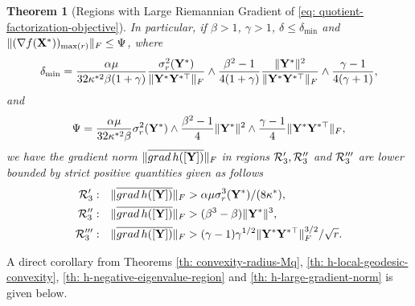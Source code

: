 \documentclass[11pt]{article}
\newtheorem{Theorem}{Theorem}
\newcommand{\0}{{\mathbf{0}}}
\newcommand{\1}{{\mathbf{1}}}
\newcommand{\X}{{\mathbf{X}}}
\newcommand{\Y}{{\mathbf{Y}}}
\newcommand{\cR}{{\cal R}}
\newcommand{\grad}{{\rm grad}}
\newcommand{\F}{{\rm F}}
\newcommand{\nc}{\normalcolor}
\begin{document}
\begin{Theorem}[Regions with Large Riemannian Gradient of \eqref{eq: quotient-factorization-objective}]
In particular, if $\beta > 1$, $\gamma > 1$, $\delta \leq \delta_{\min}$ and $\| ( \nabla f(\X^*) )_{\max(r)} \|_\F \leq \Psi$, where
\begin{equation} \label{def: delta-min}
	\delta_{\min} = \frac{\alpha \mu }{32 \kappa^{*2} \beta (1 + \gamma) } \frac{\sigma_r^2(\Y^*)}{ \| \Y^* \Y^{*\top} \|_\F } \wedge  \frac{  \beta^2 - 1 }{ 4(1 + \gamma) } \frac{ \|\Y^*\|^2 }{ \| \Y^* \Y^{*\top} \|_\F } \wedge  \frac{  \gamma - 1 }{ 4( \gamma + 1 ) },
\end{equation} and
\begin{equation} \label{def: Psi}
	\Psi = \frac{\alpha \mu}{32 \kappa^{*2} \beta } \sigma^2_r(\Y^*) \wedge  \frac{ \beta^2 -1 }{4 } \|\Y^*\|^2 \wedge   \frac{\gamma-1}{4}  \|\Y^* \Y^{*\top} \|_\F, 
\end{equation}
 we have the gradient norm $\|\overline{\grad\, h([\Y])} \|_\F$ in regions $\cR_3', \cR_3''$ and $\cR_3'''$ are lower bounded by strict positive quantities given as follows
\begin{equation} \label{ineq: h-gradient-bound-all}
	\begin{split}
		\cR_3': &  \quad \|\overline{\grad\, h([\Y])} \|_\F > \alpha\mu \sigma^3_r(\Y^*)/ (8 \kappa^* ), \\
		\cR_3'': &  \quad  \|\overline{\grad\, h([\Y])} \|_\F > (\beta^3 - \beta) \|\Y^*\|^3, \\
		\cR_3''': & \quad    \|\overline{\grad\, h([\Y])} \|_\F > ( \gamma- 1) \gamma^{1/2} \|\Y^*\Y^{*\top}\|^{3/2}_\F/\sqrt{r}.
	\end{split}
\end{equation} 
\end{Theorem}

A direct corollary from Theorems \ref{th: convexity-radius-Mq}\nc, \ref{th: h-local-geodesic-convexity}, \ref{th: h-negative-eigenvalue-region} and \ref{th: h-large-gradient-norm} is given below.
\end{document}
